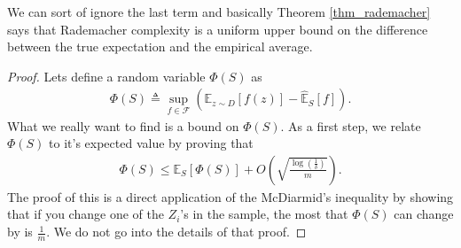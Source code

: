 \documentclass[10pt ]{article}
\begin{document}
We can sort of ignore the last term and basically Theorem \ref{thm_rademacher} says that Rademacher complexity is a uniform upper bound on the difference between the true expectation and the empirical average. 
\begin{proof}
Lets define a random variable $\Phi(S)$ as 
\begin{align}
\Phi(S) \triangleq \sup_{f \in \mathcal{F}}  \left( \mathbb{E}_{z \sim D} \left[ f(z) \right] - \widehat{\mathbb{E}}_{S}\left[ f\right] \right).
\label{eq_def_phi_s}
\end{align}
What we really want to find is a bound on $\Phi(S)$. As a first step, we relate $\Phi(S)$ to it's expected value by proving that 
\begin{align}
\Phi(S) \le \mathbb{E}_S \left[ \Phi(S) \right] + O \left( \sqrt{\frac{\log(\frac{1}{\delta})}{m}} \right).
\end{align}
The proof of this is a direct application of the McDiarmid's inequality by showing that if you change one of the $Z_i$'s in the sample, the most that $\Phi(S)$ can change by is $\frac{1}{m}$. We do not go into the details of that proof. 


\end{proof}
\end{document}
